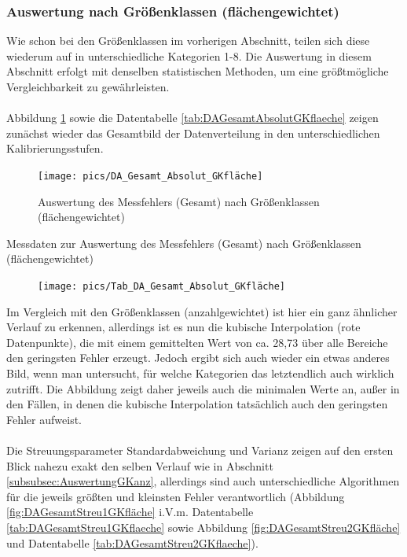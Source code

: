 \documentclass[
fontsize=10pt, 
listof = totoc,
parskip = half	
]{report}
\begin{document}
\subsubsection{Auswertung nach Größenklassen (flächengewichtet)}
\label{subsubsec:AuswertungGKflaeche}
Wie schon bei den Größenklassen im vorherigen Abschnitt, teilen sich diese wiederum auf in unterschiedliche Kategorien 1-8. Die Auswertung in diesem Abschnitt erfolgt mit denselben statistischen Methoden, um eine größtmögliche Vergleichbarkeit zu gewährleisten.
\\\\
\noindent Abbildung \ref{fig:DAGesamtAbsolutGKflaeche} sowie die Datentabelle \ref{tab:DAGesamtAbsolutGKflaeche} zeigen zunächst wieder das Gesamtbild der Datenverteilung in den unterschiedlichen Kalibrierungsstufen.

\begin{figure}[H]
	\centering
	\texttt{[image: pics/DA\_Gesamt\_Absolut\_GKfläche]}
	\caption{Auswertung des Messfehlers (Gesamt) nach Größenklassen (flächengewichtet)}
	\label{fig:DAGesamtAbsolutGKflaeche}
\end{figure}

\begin{table}[H]
	\caption{Messdaten zur Auswertung des Messfehlers (Gesamt) nach Größenklassen (flächengewichtet)}
	\label{tab:DAGesamtAbsolutGKflaeche}
	\begin{figure}[H]
		\centering
		\texttt{[image: pics/Tab\_DA\_Gesamt\_Absolut\_GKfläche]}
	\end{figure}
\end{table}

\noindent Im Vergleich mit den Größenklassen (anzahlgewichtet) ist hier ein ganz ähnlicher Verlauf zu erkennen, allerdings ist es nun die kubische Interpolation (rote Datenpunkte), die mit einem gemittelten Wert von ca. 28,73 über alle Bereiche den geringsten Fehler erzeugt. Jedoch ergibt sich auch wieder ein etwas anderes Bild, wenn man untersucht, für welche Kategorien das letztendlich auch wirklich zutrifft. Die Abbildung zeigt daher jeweils auch die minimalen Werte an, außer in den Fällen, in denen die kubische Interpolation tatsächlich auch den geringsten Fehler aufweist. 
\\\\
\noindent Die Streuungsparameter Standardabweichung und Varianz zeigen auf den ersten Blick nahezu exakt den selben Verlauf wie in Abschnitt \ref{subsubsec:AuswertungGKanz}, allerdings sind auch unterschiedliche Algorithmen für die jeweils größten und kleinsten Fehler verantwortlich (Abbildung \ref{fig:DAGesamtStreu1GKfläche} i.V.m. Datentabelle \ref{tab:DAGesamtStreu1GKflaeche} sowie Abbildung \ref{fig:DAGesamtStreu2GKfläche} und Datentabelle \ref{tab:DAGesamtStreu2GKflaeche}).
\end{document}
